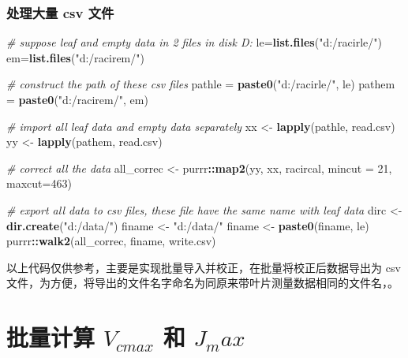 \documentclass[
]{krantz}
\makeatletter
\newenvironment{Shaded}{\begin{snugshade}}{\end{snugshade}}
\newcommand{\CommentTok}[1]{\textcolor[rgb]{0.56,0.35,0.01}{\textit{#1}}}
\newcommand{\DataTypeTok}[1]{\textcolor[rgb]{0.13,0.29,0.53}{#1}}
\newcommand{\DecValTok}[1]{\textcolor[rgb]{0.00,0.00,0.81}{#1}}
\newcommand{\KeywordTok}[1]{\textcolor[rgb]{0.13,0.29,0.53}{\textbf{#1}}}
\newcommand{\NormalTok}[1]{#1}
\newcommand{\OperatorTok}[1]{\textcolor[rgb]{0.81,0.36,0.00}{\textbf{#1}}}
\newcommand{\StringTok}[1]{\textcolor[rgb]{0.31,0.60,0.02}{#1}}
\newenvironment{kframe}{%
\medskip{}
\setlength{\fboxsep}{.8em}
 \def\at@end@of@kframe{}%
 \ifinner\ifhmode%
  \def\at@end@of@kframe{\end{minipage}}%
  \begin{minipage}{\columnwidth}%
 \fi\fi%
 \def\FrameCommand##1{\hskip\@totalleftmargin \hskip-\fboxsep
 \colorbox{shadecolor}{##1}\hskip-\fboxsep
     \hskip-\linewidth \hskip-\@totalleftmargin \hskip\columnwidth}%
 \MakeFramed {\advance\hsize-\width
   \@totalleftmargin\z@ \linewidth\hsize
   \@setminipage}}%
 {\par\unskip\endMakeFramed%
 \at@end@of@kframe}
\renewenvironment{Shaded}{\begin{kframe}}{\end{kframe}}
\makeatother
\begin{document}
\hypertarget{imbycsv}{%
\subsubsection{处理大量 csv 文件}\label{imbycsv}}

\begin{Shaded}
\begin{Highlighting}[]
\CommentTok{\# suppose leaf and empty data in 2 files in disk D:}
\NormalTok{le=}\KeywordTok{list.files}\NormalTok{(}\StringTok{"d:/racirle/"}\NormalTok{)}
\NormalTok{em=}\KeywordTok{list.files}\NormalTok{(}\StringTok{"d:/racirem/"}\NormalTok{)}

\CommentTok{\# construct the path of these csv files}
\NormalTok{pathle =}\StringTok{ }\KeywordTok{paste0}\NormalTok{(}\StringTok{"d:/racirle/"}\NormalTok{, le)}
\NormalTok{pathem =}\StringTok{ }\KeywordTok{paste0}\NormalTok{(}\StringTok{"d:/racirem/"}\NormalTok{, em)}

\CommentTok{\# import all leaf data and empty data separately}
\NormalTok{xx \textless{}{-}}\StringTok{ }\KeywordTok{lapply}\NormalTok{(pathle, read.csv)}
\NormalTok{yy \textless{}{-}}\StringTok{ }\KeywordTok{lapply}\NormalTok{(pathem, read.csv)}

\CommentTok{\# correct all the data}
\NormalTok{all\_correc \textless{}{-}}\StringTok{ }\NormalTok{purrr}\OperatorTok{::}\KeywordTok{map2}\NormalTok{(yy, xx, racircal, }\DataTypeTok{mincut =} \DecValTok{21}\NormalTok{, }\DataTypeTok{maxcut=}\DecValTok{463}\NormalTok{)}

\CommentTok{\#  export all data to csv files, these file have the same name with leaf data}
\NormalTok{dirc \textless{}{-}}\StringTok{ }\KeywordTok{dir.create}\NormalTok{(}\StringTok{"d:/data/"}\NormalTok{)}
\NormalTok{finame \textless{}{-}}\StringTok{ "d:/data/"}
\NormalTok{finame \textless{}{-}}\StringTok{ }\KeywordTok{paste0}\NormalTok{(finame, le)}
\NormalTok{purrr}\OperatorTok{::}\KeywordTok{walk2}\NormalTok{(all\_correc,  finame, write.csv)}
\end{Highlighting}
\end{Shaded}

以上代码仅供参考，主要是实现批量导入并校正，在批量将校正后数据导出为 csv 文件，为方便，将导出的文件名字命名为同原来带叶片测量数据相同的文件名，。

\hypertarget{fitbatracir}{%
\section{\texorpdfstring{批量计算 \(V_{cmax}\) 和 \(J_max\)}{批量计算 V\_\{cmax\} 和 J\_max}}\label{fitbatracir}}
\end{document}
